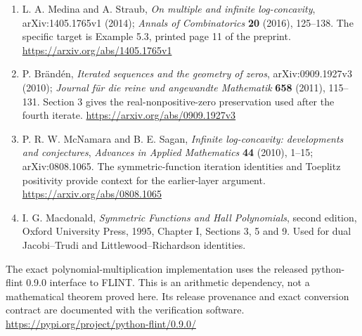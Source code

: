 \documentclass[
  11pt,
]{article}
\providecommand{\tightlist}{%
  \setlength{\itemsep}{0pt}\setlength{\parskip}{0pt}}
\begin{document}
\begin{enumerate}
\def\labelenumi{\arabic{enumi}.}
\tightlist
\item
  L. A. Medina and A. Straub, \emph{On multiple and infinite
  log-concavity}, arXiv:1405.1765v1 (2014); \emph{Annals of
  Combinatorics} \textbf{20} (2016), 125--138. The specific target is
  Example 5.3, printed page 11 of the preprint.
  \url{https://arxiv.org/abs/1405.1765v1}
\item
  P. Brändén, \emph{Iterated sequences and the geometry of zeros},
  arXiv:0909.1927v3 (2010); \emph{Journal für die reine und angewandte
  Mathematik} \textbf{658} (2011), 115--131. Section 3 gives the
  real-nonpositive-zero preservation used after the fourth iterate.
  \url{https://arxiv.org/abs/0909.1927v3}
\item
  P. R. W. McNamara and B. E. Sagan, \emph{Infinite log-concavity:
  developments and conjectures}, \emph{Advances in Applied Mathematics}
  \textbf{44} (2010), 1--15; arXiv:0808.1065. The symmetric-function
  iteration identities and Toeplitz positivity provide context for the
  earlier-layer argument. \url{https://arxiv.org/abs/0808.1065}
\item
  I. G. Macdonald, \emph{Symmetric Functions and Hall Polynomials},
  second edition, Oxford University Press, 1995, Chapter I, Sections 3,
  5 and 9. Used for dual Jacobi--Trudi and Littlewood--Richardson
  identities.
\end{enumerate}

The exact polynomial-multiplication implementation uses the released
python-flint 0.9.0 interface to FLINT. This is an arithmetic dependency,
not a mathematical theorem proved here. Its release provenance and exact
conversion contract are documented with the verification software.
\url{https://pypi.org/project/python-flint/0.9.0/}
\end{document}
